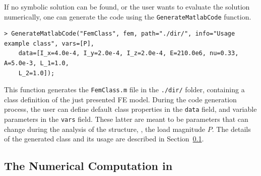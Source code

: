 If no symbolic solution can be found, or the user wants to evaluate the solution numerically, one can generate the \Matlab{} code using the \texttt{GenerateMatlabCode} function.
%
\begin{verbatim}
> GenerateMatlabCode("FemClass", fem, path="./dir/", info="Usage example class", vars=[P],
    data=[I_x=4.0e-4, I_y=2.0e-4, I_z=2.0e-4, E=210.0e6, nu=0.33, A=5.0e-3, L_1=1.0,
    L_2=1.0]);
\end{verbatim}
%
This function generates the \texttt{FemClass.m} file in the \texttt{./dir/} folder, containing a class definition of the just presented FE model. During the code generation process, the user can define default class properties in the \texttt{data} field, and variable parameters in the \texttt{vars} field. These latter are meant to be parameters that can change during the analysis of the structure, \eg{}, the load magnitude $P$. The details of the generated class and its usage are described in Section~\ref{chap7:subsec:numerical_computation}.

\subsection{The Numerical Computation in \Matlab{}}
\label{chap7:subsec:numerical_computation}

